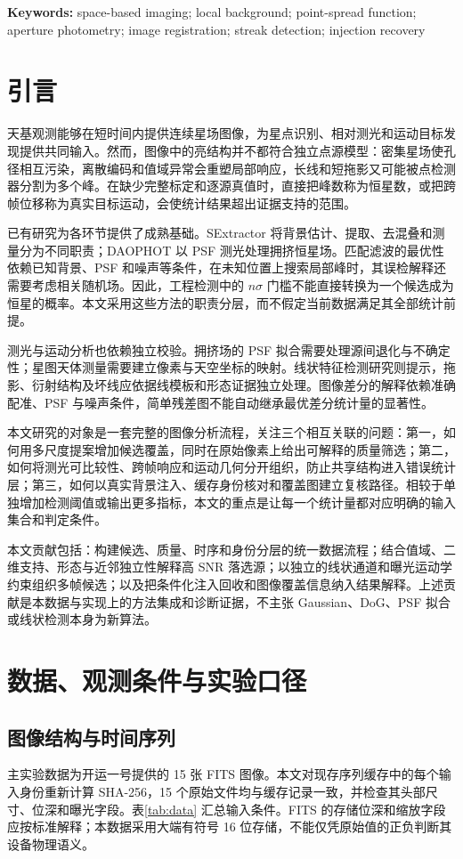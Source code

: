 \documentclass[UTF8,a4paper,11pt,fontset=windows]{ctexart}
\begin{document}
\smallskip\noindent\textbf{Keywords:} space-based imaging; local background; point-spread function; aperture photometry; image registration; streak detection; injection recovery

\section{引言}
天基观测能够在短时间内提供连续星场图像，为星点识别、相对测光和运动目标发现提供共同输入。然而，图像中的亮结构并不都符合独立点源模型：密集星场使孔径相互污染，离散编码和值域异常会重塑局部响应，长线和短拖影又可能被点检测器分割为多个峰。在缺少完整标定和逐源真值时，直接把峰数称为恒星数，或把跨帧位移称为真实目标运动，会使统计结果超出证据支持的范围。

已有研究为各环节提供了成熟基础。SExtractor 将背景估计、提取、去混叠和测量分为不同职责\cite{sextractor}；DAOPHOT 以 PSF 测光处理拥挤恒星场\cite{daophot}。匹配滤波的最优性依赖已知背景、PSF 和噪声等条件\cite{langhogg}，在未知位置上搜索局部峰时，其误检解释还需要考虑相关随机场\cite{vio}。因此，工程检测中的 $n\sigma$ 门槛不能直接转换为一个候选成为恒星的概率。本文采用这些方法的职责分层，而不假定当前数据满足其全部统计前提。

测光与运动分析也依赖独立校验。拥挤场的 PSF 拟合需要处理源间退化与不确定性\cite{hedges}；星图天体测量需要建立像素与天空坐标的映射\cite{astrometry}。线状特征检测研究则提示，拖影、衍射结构及坏线应依据线模板和形态证据独立处理\cite{nir}。图像差分的解释依赖准确配准、PSF 与噪声条件\cite{zogy}，简单残差图不能自动继承最优差分统计量的显著性。

本文研究的对象是一套完整的图像分析流程，关注三个相互关联的问题：第一，如何用多尺度提案增加候选覆盖，同时在原始像素上给出可解释的质量筛选；第二，如何将测光可比较性、跨帧响应和运动几何分开组织，防止共享结构进入错误统计层；第三，如何以真实背景注入、缓存身份核对和覆盖图建立复核路径。相较于单独增加检测阈值或输出更多指标，本文的重点是让每一个统计量都对应明确的输入集合和判定条件。

本文贡献包括：构建候选、质量、时序和身份分层的统一数据流程；结合值域、二维支持、形态与近邻独立性解释高 SNR 落选源；以独立的线状通道和曝光运动学约束组织多帧候选；以及把条件化注入回收和图像覆盖信息纳入结果解释。上述贡献是本数据与实现上的方法集成和诊断证据，不主张 Gaussian、DoG、PSF 拟合或线状检测本身为新算法。

\section{数据、观测条件与实验口径}\label{sec:data}
\subsection{图像结构与时间序列}
主实验数据为开运一号提供的 15 张 FITS 图像。本文对现存序列缓存中的每个输入身份重新计算 SHA-256，15 个原始文件均与缓存记录一致，并检查其头部尺寸、位深和曝光字段。表\ref{tab:data} 汇总输入条件。FITS 的存储位深和缩放字段应按标准解释\cite{fits}；本数据采用大端有符号 16 位存储，不能仅凭原始值的正负判断其设备物理语义。
\end{document}
